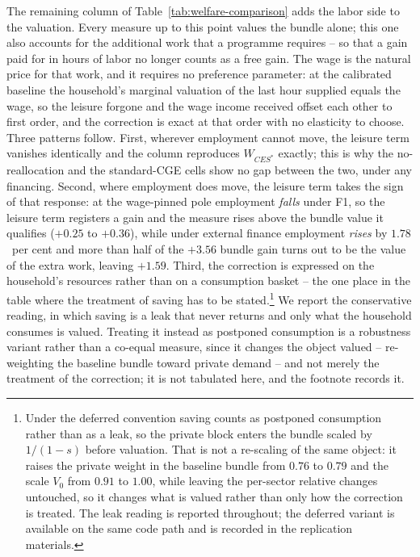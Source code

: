 
The remaining column of Table~\ref{tab:welfare-comparison} adds the labor side to the valuation. Every measure up to this point values the bundle alone; this one also accounts for the additional work that a programme requires -- so that a gain paid for in hours of labor no longer counts as a free gain. The wage is the natural price for that work, and it requires no preference parameter: at the calibrated baseline the household's marginal valuation of the last hour supplied equals the wage, so the leisure forgone and the wage income received offset each other to first order, and the correction is exact at that order with no elasticity to choose. Three patterns follow. First, wherever employment cannot move, the leisure term vanishes identically and the column reproduces $W_{CES^*}$ exactly; this is why the no-reallocation and the standard-CGE cells show no gap between the two, under any financing. Second, where employment does move, the leisure term takes the sign of that response: at the wage-pinned pole employment \emph{falls} under F1, so the leisure term registers a gain and the measure rises above the bundle value it qualifies ($+0.25$ to $+0.36$), while under external finance employment \emph{rises} by $1.78$~per cent and more than half of the $+3.56$ bundle gain turns out to be the value of the extra work, leaving $+1.59$. Third, the correction is expressed on the household's resources rather than on a consumption basket -- the one place in the table where the treatment of saving has to be stated.\footnote{Under the deferred convention saving counts as postponed consumption rather than as a leak, so the private block enters the bundle scaled by $1/(1-s)$ before valuation. That is not a re-scaling of the same object: it raises the private weight in the baseline bundle from $0.76$ to $0.79$ and the scale $V_0$ from $0.91$ to $1.00$, while leaving the per-sector relative changes untouched, so it changes what is valued rather than only how the correction is treated. The leak reading is reported throughout; the deferred variant is available on the same code path and is recorded in the replication materials.} We report the conservative reading, in which saving is a leak that never returns and only what the household consumes is valued. Treating it instead as postponed consumption is a robustness variant rather than a co-equal measure, since it changes the object valued -- re-weighting the baseline bundle toward private demand -- and not merely the treatment of the correction; it is not tabulated here, and the footnote records it.
